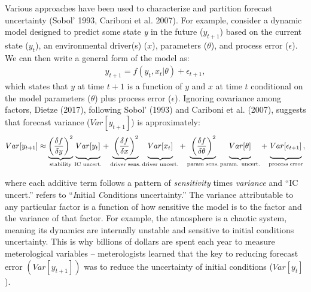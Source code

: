 \documentclass[12pt,]{article}
\begin{document}
Various approaches have been used to characterize and partition forecast
uncertainty (Sobol' 1993, Cariboni et al. 2007). For example, consider a
dynamic model designed to predict some state \emph{y} in the future
(\(y_{t+1}\)) based on the current state (\(y_{t}\)), an environmental
driver(s) (\(x\)), parameters (\(\theta\)), and process error
(\(\epsilon\)). We can then write a general form of the model as:
\begin{align}
y_{t+1} = f(y_t, x_t|\theta) + \epsilon_{t+1},
\end{align} which states that \(y\) at time \(t+1\) is a function of
\(y\) and \(x\) at time \(t\) conditional on the model parameters
(\(\theta\)) plus process error (\(\epsilon\)). Ignoring covariance
among factors, Dietze (2017), following Sobol' (1993) and Cariboni et
al. (2007), suggests that forecast variance (\(Var[y_{t+1}]\)) is
approximately: \begin{align}
Var[y_{t+1}] \approx \underbrace{\left(\frac{\delta f}{\delta y} \right)^2}_{\text{stability}} 
               \underbrace{\vphantom{ \left(\frac{\delta f}{\delta y} \right)^2 } Var[y_t]}_{\text{IC uncert.}} +
               \underbrace{\vphantom{ \left(\frac{\delta f}{\delta y} \right)^2 }\left(\frac{\delta f}{\delta x} \right)^2}_{\text{driver sens.}} 
               \underbrace{\vphantom{ \left(\frac{\delta f}{\delta y} \right)^2 } Var[x_t]}_{\text{driver uncert.}} +
               \underbrace{\vphantom{ \left(\frac{\delta f}{\delta y} \right)^2 }\left(\frac{\delta f}{\delta \theta} \right)^2}_{\text{param sens.}}
               \underbrace{\vphantom{ \left(\frac{\delta f}{\delta y} \right)^2 } Var[\theta]}_{\text{param. uncert.}} +
               \underbrace{\vphantom{ \left(\frac{\delta f}{\delta y} \right)^2 } Var[\epsilon_{t+1}]}_{\text{process error}},
\end{align}

where each additive term follows a pattern of \emph{sensitivity} times
\emph{variance} and ``IC uncert.'' refers to ``\emph{I}nitial
\emph{C}onditions uncertainty.'' The variance attributable to any
particular factor is a function of how sensitive the model is to the
factor and the variance of that factor. For example, the atmosphere is a
chaotic system, meaning its dynamics are internally unstable and
sensitive to initial conditions uncertainty. This is why billions of
dollars are spent each year to measure meterological variables --
meterologists learned that the key to reducing forecast error
\((Var[y_{t+1}])\) was to reduce the uncertainty of initial conditions
(\(Var[y_t]\)).
\end{document}
